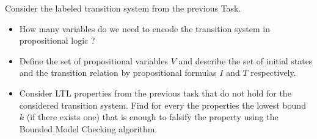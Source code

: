 \documentclass[language=en,sheet=4,prefix]{exercise}
\begin{document}


Consider the labeled transition system from the previous Task.
\begin{itemize}  
\item How many variables do we need to encode the transition system in propositional logic ?
\item Define the set of propositional variables $V$ and describe the set of initial states and the transition relation by propositional formulas $I$ and $T$ respectively.
\item Consider LTL properties from the previous task that do not hold for the considered transition system. Find for every the properties the lowest bound $k$ (if there exists one) that is enough to falsify the property using the Bounded Model Checking algorithm.  
\end{itemize}

\end{document}
